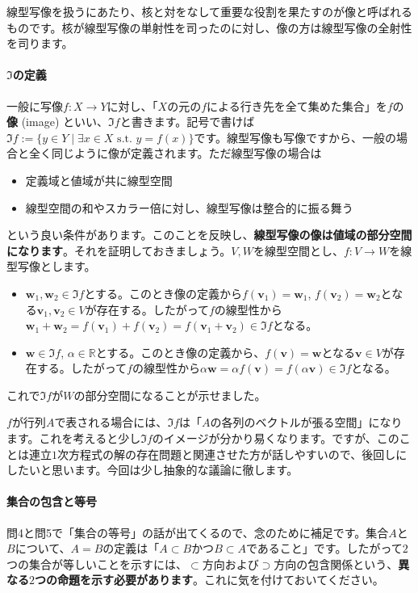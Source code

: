 線型写像を扱うにあたり、核と対をなして重要な役割を果たすのが像と呼ばれるものです。核が線型写像の単射性を司ったのに対し、像の方は線型写像の全射性を司ります。

\paragraph{$\Im$の定義}

一般に写像$f\colon X\rightarrow Y$に対し、「$X$の元の$f$による行き先を全て集めた集合」を$f$の\textbf{像} (image) といい、$\Im f$と書きます。記号で書けば$\Im f := \{y \in Y \mid \exists x\in X \text{ s.t. } y = f(x)\}$です。線型写像も写像ですから、一般の場合と全く同じように像が定義されます。ただ線型写像の場合は
\begin{itemize}
\item 定義域と値域が共に線型空間
\item 線型空間の和やスカラー倍に対し、線型写像は整合的に振る舞う
\end{itemize}
という良い条件があります。このことを反映し、\textbf{線型写像の像は値域の部分空間になります}。それを証明しておきましょう。$V, W$を線型空間とし、$f\colon V\rightarrow W$を線型写像とします。
\begin{itemize}
\item $\bm{w}_1, \bm{w}_2\in \Im f$とする。このとき像の定義から$f(\bm{v}_1) = \bm{w}_1$, $f(\bm{v}_2) = \bm{w}_2$となる$\bm{v}_1, \bm{v}_2\in V$が存在する。したがって$f$の線型性から$\bm{w}_1 + \bm{w}_2 = f(\bm{v}_1) + f(\bm{v}_2) = f(\bm{v}_1 + \bm{v}_2) \in \Im f$となる。
\item $\bm{w}\in \Im f$, $\alpha\in\mathbb{R}$とする。このとき像の定義から、$f(\bm{v}) = \bm{w}$となる$\bm{v} \in V$が存在する。したがって$f$の線型性から$\alpha \bm{w} = \alpha f(\bm{v}) = f(\alpha \bm{v}) \in \Im f$となる。
\end{itemize}
これで$\Im f$が$W$の部分空間になることが示せました。

$f$が行列$A$で表される場合には、$\Im f$は「$A$の各列のベクトルが張る空間」になります。これを考えると少し$\Im f$のイメージが分かり易くなります。ですが、このことは連立$1$次方程式の解の存在問題と関連させた方が話しやすいので、後回しにしたいと思います。今回は少し抽象的な議論に徹します。

\paragraph{集合の包含と等号}

問4と問5で「集合の等号」の話が出てくるので、念のために補足です。集合$A$と$B$について、$A=B$の定義は「$A\subset B$かつ$B\subset A$であること」です。したがって$2$つの集合が等しいことを示すには、$\subset$方向および$\supset$方向の包含関係という、\textbf{異なる$2$つの命題を示す必要があります}。これに気を付けておいてください。

